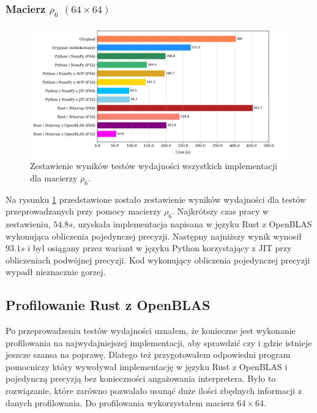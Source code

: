 \documentclass[11pt, a4paper]{article}
\begin{document}
\begin{sloppypar}
    \subsubsection{Macierz \texorpdfstring{$\rho_{6}$ $(64\times64)$}{rho6 64x64}}
    \begin{figure}[!ht]
      \centering
      \includegraphics[width=1.0\textwidth]{"resources/rho_6_matrix_comparison.png"}
      \caption{Zestawienie wyników testów wydajności wszystkich implementacji dla macierzy $\rho
      _{6}$.}
      \label{matrix-comparison-rho-6-plot}
    \end{figure}
    Na rysunku \ref{matrix-comparison-rho-6-plot} przedstawione zostało zestawienie
    wyników wydajności dla testów przeprowadzanych przy pomocy macierzy $\rho_{6}$. Najkrótszy
    czas pracy w zestawieniu, $54.8s$, uzyskała implementacja napisana w języku Rust z OpenBLAS
    wykonująca obliczenia pojedynczej precyzji. Następny najniższy wynik wynosił $93.1s$
    i był osiągany przez wariant w języku Python korzystający z JIT przy obliczeniach
    podwójnej precyzji. Kod wykonujący obliczenia pojedynczej precyzji wypadł nieznacznie
    gorzej.

    \FloatBarrier

    \subsection{Profilowanie Rust z OpenBLAS}
    Po przeprowadzeniu testów wydajności uznałem, że konieczne jest wykonanie profilowania
    na najwydajniejszej implementacji, aby sprawdzić czy i gdzie istnieje jeszcze szansa
    na poprawę. Dlatego też przygotowałem odpowiedni program pomocniczy który wywoływał implementację
    w języku Rust z OpenBLAS i pojedynczą precyzją bez konieczności angażowania interpretera.
    Było to rozwiązanie, które zarówno pozwalało usunąć duże ilości zbędnych informacji z
    danych profilowania. Do profilowania wykorzystałem macierz $64\times64$.


\end{sloppypar}
\end{document}
